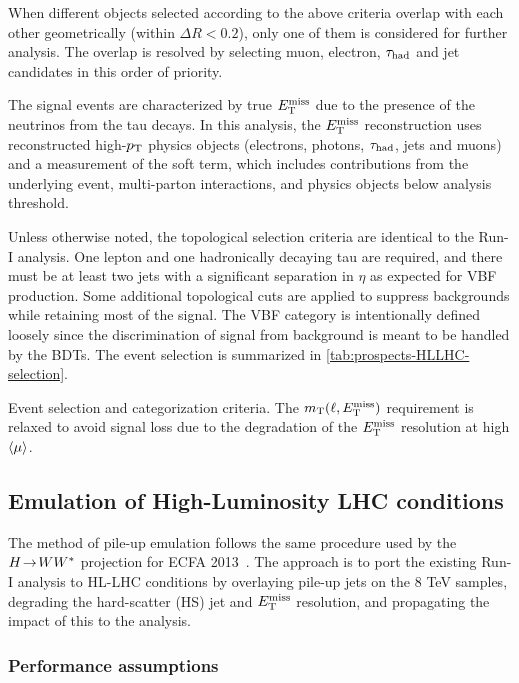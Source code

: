 When different objects selected according to the above criteria overlap with each other geometrically (within $\Delta R < 0.2$), only one of them is considered for further analysis. The overlap is resolved by selecting muon, electron, $\tau_\text{had}$ and jet candidates in this order of priority.

The signal events are characterized by true $E_{\mathrm{T}}^{\mathrm{miss}}$ due to the presence of the neutrinos from the tau decays. In this analysis, the $E_{\mathrm{T}}^{\mathrm{miss}}$ reconstruction uses reconstructed high-$p_{\mathrm{T}}$ physics objects (electrons, photons, $\tau_\text{had}$, jets and muons) and a measurement of the soft term, which includes contributions from the underlying event, multi-parton interactions, and physics objects below analysis threshold.

Unless otherwise noted, the topological selection criteria are identical to the Run-I analysis. One lepton and one hadronically decaying tau are required, and there must be at least two jets with a significant separation in $\eta$ as expected for VBF production. Some additional topological cuts are applied to suppress backgrounds while retaining most of the signal. The VBF category is intentionally defined loosely since the discrimination of signal from background is meant to be handled by the BDTs. The event selection is summarized in \cref{tab:prospects-HLLHC-selection}.

\begin{table}[bp]
  \centering
  \renewcommand{\arraystretch}{1.4}
  \caption{Event selection and categorization criteria. The $m_\text{T}(\ell, E_{\mathrm{T}}^{\mathrm{miss}})$ requirement is relaxed to avoid signal loss due to the degradation of the $E_{\mathrm{T}}^{\mathrm{miss}}$ resolution at high $\langle\mu\rangle$.}
  
  \label{tab:prospects-HLLHC-selection}
\end{table}

\subsection{Emulation of High-Luminosity LHC conditions}

The method of pile-up emulation follows the same procedure used by the $H \!\rightarrow\! WW^\ast$ projection for ECFA 2013~\cite{ATL-PHYS-PUB-2013-014}. The approach is to port the existing Run-I analysis to HL-LHC conditions by overlaying pile-up jets on the 8 TeV samples, degrading the hard-scatter (HS) jet and $E_{\mathrm{T}}^{\mathrm{miss}}$ resolution, and propagating the impact of this to the analysis.

\subsubsection{Performance assumptions}

